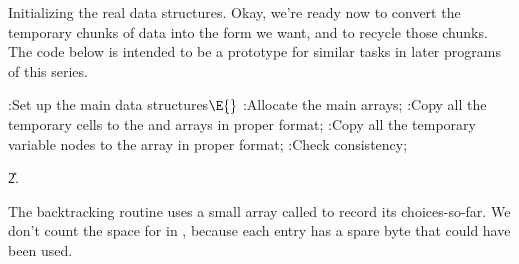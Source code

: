 Initializing the real data structures.
Okay, we're ready now to convert the temporary chunks of data into the
form we want, and to recycle those chunks. The code below is intended to be
a prototype for similar tasks in later programs of this series.

\Y\B\4:Set up the main data structures\X${}\E{}$\6
:Allocate the main arrays\X;\6
:Copy all the temporary cells to the  and  arrays
in proper format\X;\6
:Copy all the temporary variable nodes to the  array in proper
format\X;\6
:Check consistency\X;\par
\U2.\fi

The backtracking routine uses a small array called  to
record
its choices-so-far. We don't count the space for  in , because
each  entry has a spare byte that could have been used.

